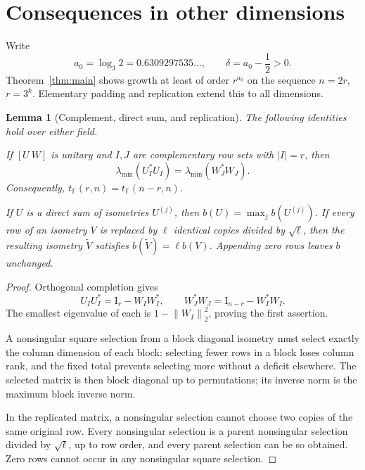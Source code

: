 \documentclass[11pt,letterpaper]{article}
\newtheorem{lemma}[theorem]{Lemma}
\theoremstyle{definition}
\theoremstyle{remark}
\newcommand{\F}{\mathbb F}
\newcommand{\Id}{\mathrm I}
\newcommand{\norm}[1]{\left\lVert#1\right\rVert}
\begin{document}
\section{Consequences in other dimensions}

Write
\[
 a_0=\log_3 2=0.6309297535\ldots,\qquad
 \delta=a_0-\frac12>0.
\]
Theorem~\ref{thm:main} shows growth at least of order $r^{a_0}$ on the sequence $n=2r$, $r=3^k$. Elementary padding and replication extend this to all dimensions.

\begin{lemma}[Complement, direct sum, and replication]\label{lem:operations}
The following identities hold over either field.

If $[U\ W]$ is unitary and $I,J$ are complementary row sets with $|I|=r$, then
\[
 \lambda_{\min}(U_I^*U_I)=\lambda_{\min}(W_J^*W_J).
\]
Consequently, $t_\F(r,n)=t_\F(n-r,n)$.

If $U$ is a direct sum of isometries $U^{(j)}$, then
$b(U)=\max_j b(U^{(j)})$. If every row of an isometry $V$ is replaced by $\ell$ identical copies divided by $\sqrt\ell$, then the resulting isometry $\widetilde V$ satisfies $b(\widetilde V)=\ell b(V)$. Appending zero rows leaves $b$ unchanged.
\end{lemma}
\begin{proof}
Orthogonal completion gives
\[
 U_IU_I^*=\Id_r-W_IW_I^*,\qquad
 W_J^*W_J=\Id_{n-r}-W_I^*W_I.
\]
The smallest eigenvalue of each is $1-\norm{W_I}_2^2$, proving the first assertion.

A nonsingular square selection from a block diagonal isometry must select exactly the column dimension of each block: selecting fewer rows in a block loses column rank, and the fixed total prevents selecting more without a deficit elsewhere. The selected matrix is then block diagonal up to permutations; its inverse norm is the maximum block inverse norm.

In the replicated matrix, a nonsingular selection cannot choose two copies of the same original row. Every nonsingular selection is a parent nonsingular selection divided by $\sqrt\ell$, up to row order, and every parent selection can be so obtained. Zero rows cannot occur in any nonsingular square selection.
\end{proof}
\end{document}

